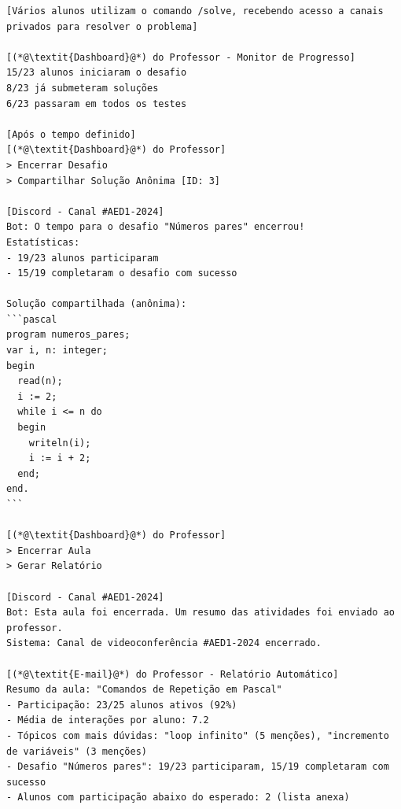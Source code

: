 \begin{lstlisting}
[Vários alunos utilizam o comando /solve, recebendo acesso a canais privados para resolver o problema]

[(*@\textit{Dashboard}@*) do Professor - Monitor de Progresso]
15/23 alunos iniciaram o desafio
8/23 já submeteram soluções
6/23 passaram em todos os testes

[Após o tempo definido]
[(*@\textit{Dashboard}@*) do Professor]
> Encerrar Desafio
> Compartilhar Solução Anônima [ID: 3]

[Discord - Canal #AED1-2024]
Bot: O tempo para o desafio "Números pares" encerrou!
Estatísticas:
- 19/23 alunos participaram
- 15/19 completaram o desafio com sucesso

Solução compartilhada (anônima):
```pascal
program numeros_pares;
var i, n: integer;
begin
  read(n);
  i := 2;
  while i <= n do
  begin
    writeln(i);
    i := i + 2;
  end;
end.
```

[(*@\textit{Dashboard}@*) do Professor]
> Encerrar Aula
> Gerar Relatório

[Discord - Canal #AED1-2024]
Bot: Esta aula foi encerrada. Um resumo das atividades foi enviado ao professor.
Sistema: Canal de videoconferência #AED1-2024 encerrado.

[(*@\textit{E-mail}@*) do Professor - Relatório Automático]
Resumo da aula: "Comandos de Repetição em Pascal"
- Participação: 23/25 alunos ativos (92%)
- Média de interações por aluno: 7.2
- Tópicos com mais dúvidas: "loop infinito" (5 menções), "incremento de variáveis" (3 menções)
- Desafio "Números pares": 19/23 participaram, 15/19 completaram com sucesso
- Alunos com participação abaixo do esperado: 2 (lista anexa)
\end{lstlisting}
